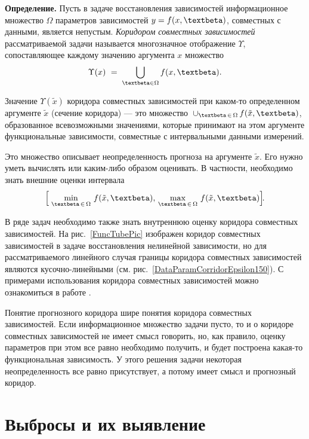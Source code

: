 \documentclass[a5paper,openany]{book}
\renewcommand{\beta}{\text{\textbeta}}
\begin{document}
{\bf Определение.}
	Пусть в задаче восстановления зависимостей информационное множество $\Omega$ 
	параметров зависимостей $y = f(x,\beta)$, совместных с данными, является непустым. 
	\textsl{Коридором совместных зависимостей} рассматриваемой задачи называется 
	многозначное  отображение $\Upsilon$, сопоставляющее каждому значению 
	аргумента $x$ множество 
	\begin{equation*} 
		\Upsilon(x) \  = \;\bigcup_{\beta\in\Omega} f(x,\beta). 
	\end{equation*} 

Значение $\Upsilon(\tilde{x})$ коридора совместных зависимостей при каком-то 
определенном аргументе $\tilde{x}$ (сечение коридора) --- это множество 
$\,\cup_{\beta \, \in \,  \Omega}\, f(\tilde{x},\beta)$, образованное всевозможными 
значениями, которые принимают на этом аргументе функциональные зависимости, 
совместные с интервальными данными измерений. 

Это множество описывает неопределенность 
прогноза на аргументе $\tilde{x}$. Его нужно уметь вычислять или каким-либо 
образом оценивать. В частности, необходимо знать внешние оценки интервала 
\begin{equation*} 
	\Bigl[\;\min_{\beta \, \in \,  \Omega}\, f(\tilde{x},\beta),\,  
	\max_{\beta \, \in \,  \Omega}\, f(\tilde{x},\beta) \Bigr]\!.   
\end{equation*} 

В ряде задач необходимо также знать внутреннюю оценку коридора совместных 
зависимостей. 
На рис.~\ref{FuncTubePic} изображен коридор совместных зависимостей в задаче 
восстановления нелинейной зависимости, но для рассматриваемого линейного 
случая границы коридора совместных зависимостей являются кусочно-линейными 
(см.  рис.~\ref{DataParamCorridorEpsilon150}). С примерами использования 
коридора совместных зависимостей можно ознакомиться в работе \cite{Kumkov2010}. 

Понятие прогнозного коридора шире понятия коридора совместных 
зависимостей. Если информационное множество задачи пусто, то и о коридоре 
совместных зависимостей не имеет смысл говорить, но, как правило, оценку 
параметров при этом все равно необходимо получить, и будет построена какая-то функциональная 
зависимость. У этого решения задачи некоторая неопределенность 
все равно присутствует, а потому имеет смысл и прогнозный коридор. 

\section{Выбросы и их выявление} 
\label{RegrOutlSect} 
\end{document}
